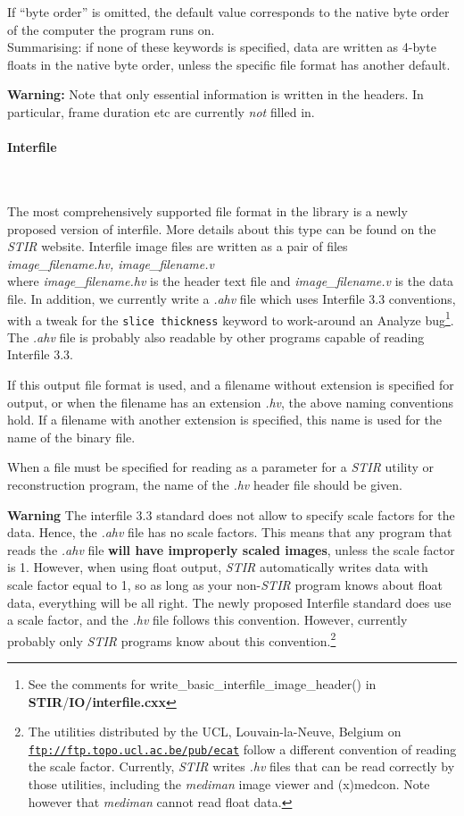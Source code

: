 \documentclass{article}
\def\url#1#2{\mbox{\href{#1}{\tt #2}}}
\newcommand{\subsubsubsection}[1]{\paragraph{#1}\mbox{} \\}
\begin{document}
{{If ``byte order'' is omitted, the default value corresponds to 
the native byte order of the computer the program runs on.\\
Summarising: if none of these keywords is specified, data are 
written as 4-byte floats in the native byte order, unless the 
specific file format has another default.



\textbf{Warning:} Note that only essential information is written 
in the headers. In particular, frame duration etc are currently \textit{not} 
filled in.

{ \subsubsubsection{Interfile}
}
\label{sec:outputinterfile}
The most comprehensively supported file format in the library 
is a newly proposed version of interfile. More details about 
this type can be found on the \textit{STIR} website.
Interfile image files are written as a pair of files
\textit{image\_filename.hv,
image\_filename.v}\\
where \textit{image\_filename.hv} is the header text file and \textit{image\_filename.v} 
is the data file. In addition, we currently write a \textit{.ahv} 
file which uses Interfile 3.3 conventions, with a tweak for the 
\texttt{slice thickness} keyword to work-around an Analyze\texttrademark{} 
bug\footnote{See the comments for write\_basic\_interfile\_image\_header() 
in \textbf{STIR}/\textbf{IO/interfile.cxx}}. The \textit{.ahv} file is probably 
also readable by other programs capable of reading Interfile 
3.3.


If this output file format is used, and a filename without extension 
is specified for output, or when the filename has an extension \textit{.hv}, 
the above naming conventions hold. If a filename with another 
extension is specified, this name is used for the name of the 
binary file. 


When a file must be specified for reading as a parameter for 
a \textit{STIR} utility or reconstruction program, the name of the \textit{.hv} 
header file should be given. 



\textbf{Warning} The interfile 3.3 standard does not allow to specify 
scale factors for the data. Hence, the \textit{.ahv} file has no scale 
factors. This means that any program that reads the \textit{.ahv} 
file \textbf{will have improperly scaled images}, unless the scale 
factor is 1. However, when using float output, \textit{STIR} automatically 
writes data with scale factor equal to 1, so as long as your 
non-\textit{STIR} program knows about float data, everything will 
be all right. The newly proposed Interfile standard does use 
a scale factor, and the \textit{.hv} file follows this convention. 
However, currently probably only \textit{STIR} programs know about 
this convention.\footnote{{\small The utilities distributed by the UCL, 
Louvain-la-Neuve, Belgium on \url{ftp://ftp.topo.ucl.ac.be/pub/ecat }{ftp://ftp.topo.ucl.ac.be/pub/ecat} 
follow a different convention of reading the scale factor. Currently, \textit{STIR} 
writes \textit{.hv} files that can be read correctly by those utilities, 
including the \textit{mediman} image viewer and (x)medcon. Note however 
that \textit{mediman} cannot read float data.}}

}}
\end{document}
